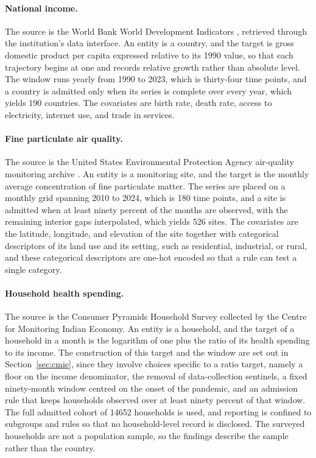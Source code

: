 \paragraph{National income.} The source is the World Bank World Development Indicators \citep{worldbankwdi}, retrieved through the institution's data interface. An entity is a country, and the target is gross domestic product per capita expressed relative to its 1990 value, so that each trajectory begins at one and records relative growth rather than absolute level. The window runs yearly from 1990 to 2023, which is thirty-four time points, and a country is admitted only when its series is complete over every year, which yields 190 countries. The covariates are birth rate, death rate, access to electricity, internet use, and trade in services.

\paragraph{Fine particulate air quality.} The source is the United States Environmental Protection Agency air-quality monitoring archive \citep{epaairdata}. An entity is a monitoring site, and the target is the monthly average concentration of fine particulate matter. The series are placed on a monthly grid spanning 2010 to 2024, which is 180 time points, and a site is admitted when at least ninety percent of the months are observed, with the remaining interior gaps interpolated, which yields 526 sites. The covariates are the latitude, longitude, and elevation of the site together with categorical descriptors of its land use and its setting, such as residential, industrial, or rural, and these categorical descriptors are one-hot encoded so that a rule can test a single category.

\paragraph{Household health spending.} The source is the Consumer Pyramids Household Survey collected by the Centre for Monitoring Indian Economy. An entity is a household, and the target of a household in a month is the logarithm of one plus the ratio of its health spending to its income. The construction of this target and the window are set out in Section~\ref{sec:cmie}, since they involve choices specific to a ratio target, namely a floor on the income denominator, the removal of data-collection sentinels, a fixed ninety-month window centred on the onset of the pandemic, and an admission rule that keeps households observed over at least ninety percent of that window. The full admitted cohort of 14652 households is used, and reporting is confined to subgroups and rules so that no household-level record is disclosed. The surveyed households are not a population sample, so the findings describe the sample rather than the country.

